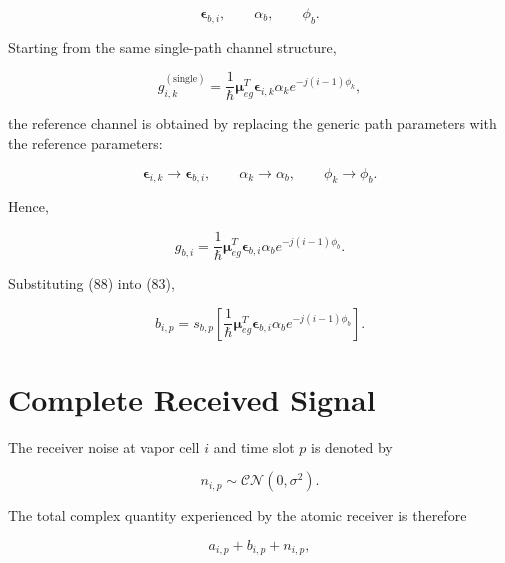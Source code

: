 \documentclass[12pt,a4paper]{article}
\begin{document}
\begin{equation}
\boldsymbol{\epsilon}_{b,i},
\qquad
\alpha_b,
\qquad
\phi_b.
\tag{85}
\end{equation}

Starting from the same single-path channel structure,

\begin{equation}
g_{i,k}^{(\mathrm{single})}
=
\frac{1}{\hbar}
\boldsymbol{\mu}_{eg}^{T}
\boldsymbol{\epsilon}_{i,k}
\alpha_k
e^{-j(i-1)\phi_k},
\tag{86}
\end{equation}

the reference channel is obtained by replacing the generic path parameters with the reference parameters:

\begin{equation}
\boldsymbol{\epsilon}_{i,k}
\rightarrow
\boldsymbol{\epsilon}_{b,i},
\qquad
\alpha_k
\rightarrow
\alpha_b,
\qquad
\phi_k
\rightarrow
\phi_b.
\tag{87}
\end{equation}

Hence,

\begin{equation}
\boxed{
g_{b,i}
=
\frac{1}{\hbar}
\boldsymbol{\mu}_{eg}^{T}
\boldsymbol{\epsilon}_{b,i}
\alpha_b
e^{-j(i-1)\phi_b}
}.
\tag{88}
\end{equation}

Substituting (88) into (83),

\begin{equation}
\boxed{
b_{i,p}
=
s_{b,p}
\left[
\frac{1}{\hbar}
\boldsymbol{\mu}_{eg}^{T}
\boldsymbol{\epsilon}_{b,i}
\alpha_b
e^{-j(i-1)\phi_b}
\right]
}.
\tag{89}
\end{equation}

\section{Complete Received Signal}

The receiver noise at vapor cell $i$ and time slot $p$ is denoted by

\begin{equation}
n_{i,p}
\sim
\mathcal{CN}(0,\sigma^2).
\tag{90}
\end{equation}

The total complex quantity experienced by the atomic receiver is therefore

\begin{equation}
a_{i,p}
+
b_{i,p}
+
n_{i,p},
\tag{91}
\end{equation}
\end{document}
